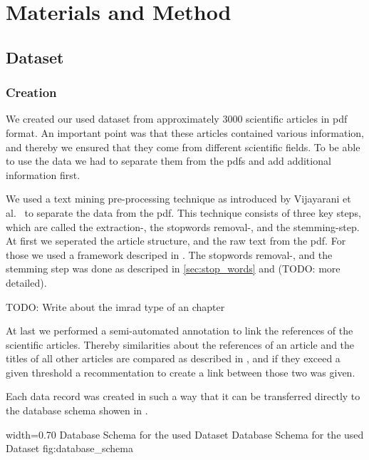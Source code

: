 \chapter{Materials and Method}
\label{cha:materials_and_method}

\section{Dataset}
\label{sec:dataset}

\subsection{Creation}
\label{sec:creation}

We created our used dataset from approximately 3000 scientific articles in pdf format. An important point was that these articles contained various information, and thereby we ensured that they come from different scientific fields. To be able to use the data we had to separate them from the pdfs and add additional information first.

We used a text mining pre-processing technique as introduced by Vijayarani et al.~\cite{Vijayarani2015} to separate the data from the pdf. This technique consists of three key steps, which are called the extraction-, the stopwords removal-, and the stemming-step. At first we seperated the article structure, and the raw text from the pdf. For those we used a framework descriped in . The stopwords removal-, and the stemming step was done as descriped in \cref{sec:stop_words} and  (TODO: more detailed).

TODO: Write about the imrad type of an chapter

At last we performed a semi-automated annotation to link the references of the scientific articles. Thereby similarities about the references of an article and the titles of all other articles are compared as described in , and if they exceed a given threshold a recommentation to create a link between those two was given.

Each data record was created in such a way that it can be transferred directly to the database schema showen in .

      {width=0.70\textwidth}
      {Database Schema for the used Dataset}
      {Database Schema for the used Dataset}
      {fig:database_schema}

